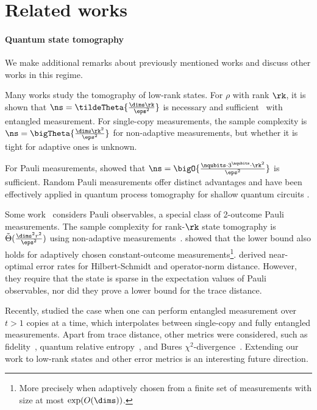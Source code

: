 \section{Related works}
\paragraph{Quantum state tomography} We make additional remarks about previously mentioned works and discuss other works in this regime.

Many works study the tomography of low-rank states. 
For $\rho$ with rank $\rk$, it is shown that $\ns = \tildeTheta{\frac{\dims \rk}{\eps^2}}$ is necessary and sufficient~\cite{HaahHJWY17,ODonnellW16} with entangled measurement. 
For single-copy measurements, the sample complexity is $\ns=\bigTheta{\frac{\dims \rk^2}{\eps^2}}$ for non-adaptive measurements, but whether it is tight for adaptive ones is unknown. 

For Pauli measurements, \cite{guctua2020fast} showed that $\ns=\bigO{\frac{\nqubits \cdot 3^\nqubits\cdot \rk^2}{\eps^2}}$ is sufficient. 
Random Pauli measurements offer distinct advantages \cite{Elben_2022} and have been effectively applied in quantum process tomography for shallow quantum circuits \cite{yu2023learningmarginalssuffices,Huang_2024}. 

Some work~\cite{compressed,Flammia_2012} considers Pauli observables, a special class of 2-outcome Pauli measurements. The sample complexity for rank-$\rk$ state tomography is ${\tilde{{\Theta}}}(\frac{\dims^2 r^2}{\eps^2})$ using non-adaptive measurements~\cite{Flammia_2012}. \cite{lowe2022lower} showed that the lower bound also holds for adaptively chosen constant-outcome measurements\footnote{More precisely when adaptively chosen from a finite set of measurements with size at most $\exp(O(\dims))$.}. \cite{cai2016optimal} derived near-optimal error rates for Hilbert-Schmidt and operator-norm distance. However, they require that the state is sparse in the expectation values of Pauli observables, nor did they prove a lower bound for the trace distance. 


Recently, \cite{Chen0L24memory} studied the case when one can perform entangled measurement over $t>1$ copies at a time, which interpolates between single-copy and fully entangled measurements. Apart from trace distance, other metrics were considered, such as fidelity~\cite{HaahHJWY17,chen2023does, Yuen_2023}, quantum relative entropy~\cite{flamian2023tomography}, and Bures $\chi^2$-divergence~\cite{flamian2023tomography}. Extending our work to low-rank states and other error metrics is an interesting future direction.
 



